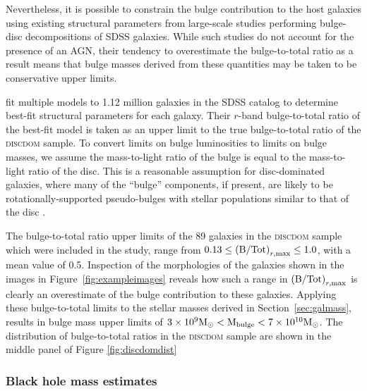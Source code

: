 Nevertheless, it is possible to constrain the bulge contribution to the host galaxies using existing structural parameters from large-scale studies performing bulge-disc decompositions of SDSS galaxies. While such studies do not account for the presence of an AGN, their tendency to overestimate the bulge-to-total ratio as a result means that bulge masses derived from these quantities may be taken to be conservative upper limits.

\citet{simard11} fit multiple models to 1.12 million galaxies in the SDSS catalog to determine best-fit structural parameters for each galaxy. Their $r$-band bulge-to-total ratio {\notebsm of the best-fit model} is taken as an upper limit to the true bulge-to-total ratio of the \textsc{discdom} sample. To convert limits on bulge luminosities to limits on bulge masses, we assume the mass-to-light ratio of the bulge is equal to the mass-to-light ratio of the disc. This is a reasonable assumption for disc-dominated galaxies, where many of the ``bulge'' components, if present, are likely to be rotationally-supported pseudo-bulges \citep{kormendy04} with stellar populations similar to that of the disc {\notebsm \citep[e.g.,][]{graham01a}}.

The bulge-to-total ratio upper limits of the 89 galaxies in the \textsc{discdom} sample which were included in the \citet{simard11} study, range from {\notebsm $0.13 \leq \left({\rm B/Tot}\right)_{r, \rm max} \leq 1.0$, with a mean value of 0.5}. Inspection of the morphologies of the galaxies shown in the images in Figure~\ref{fig:exampleimages} reveals how such a range in $\left({\rm B/Tot}\right)_{r, \rm max}$ is clearly an overestimate of the bulge contribution to these galaxies. Applying these bulge-to-total limits to the stellar masses derived in Section~\ref{sec:galmass}, results in bulge mass upper limits of {\notebsm $3 \times 10^9 \rm{M}_{\odot} < {\rm M_{bulge}} < 7 \times 10^{10} \rm{M}_{\odot} $}. The distribution of bulge-to-total ratios in the \textsc{discdom} sample are shown in the middle panel of Figure \ref{fig:discdomdist}

\subsubsection{Black hole mass estimates}\label{sec:bhmass}

